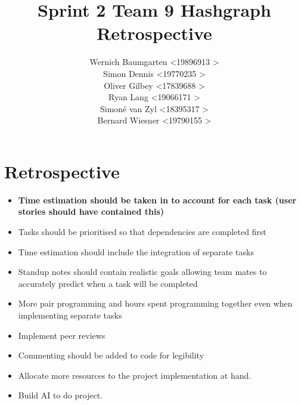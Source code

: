\documentclass[a4paper,10pt]{article}
\title{Sprint 2 Team 9 Hashgraph Retrospective}
\author{Wernich Baumgarten \textless 19896913 \textgreater \\
	Simon Dennis \textless 19770235 \textgreater  \\
		Oliver Gilbey \textless 17839688 \textgreater  \\
		Ryan Lang \textless 19066171 \textgreater  \\
		Simon\'e van Zyl \textless 18395317 \textgreater  \\
		Bernard Wiesner \textless 19790155 \textgreater}
\date{}
\begin{document}
		\maketitle
		\section{Retrospective}
		\begin{itemize}
		\item \textbf{Time estimation should be taken in to account for each task (user stories should have contained this)}
		\item Tasks should be prioritised so that dependencies are completed first
		\item Time estimation should include the integration of separate tasks
		\item Standup notes should contain realistic goals allowing team mates to accurately predict when a 
		task will be completed
		\item More pair programming and hours spent programming together even when implementing separate tasks
		\item Implement peer reviews
		\item Commenting should be added to code for legibility
		\item Allocate more resources to the project implementation at hand.
		\item Build AI to do project.
		\end{itemize}


		
\end{document}
